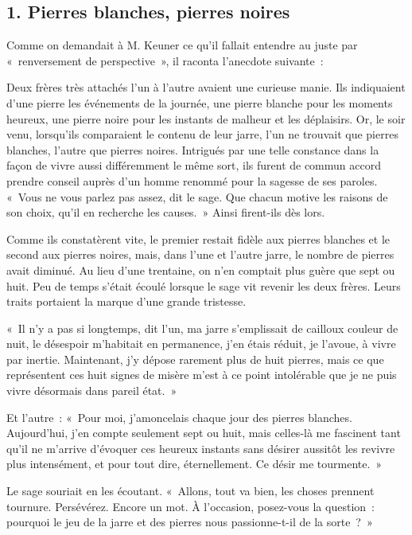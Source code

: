 \documentclass[french,twoside]{book} %
\begin{document}
\subsection[{1. Pierres blanches, pierres noires}]{\textsc{1.} Pierres blanches, pierres noires}
\noindent Comme on demandait à M. Keuner ce qu’il fallait entendre au juste par « renversement de perspective », il raconta l’anecdote suivante :\par
Deux frères très attachés l’un à l’autre avaient une curieuse manie. Ils indiquaient d’une pierre les événements de la journée, une pierre blanche pour les moments heureux, une pierre noire pour les instants de malheur et les déplaisirs. Or, le soir venu, lorsqu’ils comparaient le contenu de leur jarre, l’un ne trouvait que pierres blanches, l’autre que pierres noires. Intrigués par une telle constance dans la façon de vivre aussi différemment le même sort, ils furent de commun accord prendre conseil auprès d’un homme renommé pour la sagesse de ses paroles. « Vous ne vous parlez pas assez, dit le sage. Que chacun motive les raisons de son choix, qu’il en recherche les causes. » Ainsi firent-ils dès lors.\par
Comme ils constatèrent vite, le premier restait fidèle aux pierres blanches et le second aux pierres noires, mais, dans l’une et l’autre jarre, le nombre de pierres avait diminué. Au lieu d’une trentaine, on n’en comptait plus guère que sept ou huit. Peu de temps s’était écoulé lorsque le sage vit revenir les deux frères. Leurs traits portaient la marque d’une grande tristesse.\par
« Il n’y a pas si longtemps, dit l’un, ma jarre s’emplissait de cailloux couleur de nuit, le désespoir m’habitait en permanence, j’en étais réduit, je l’avoue, à vivre par inertie. Maintenant, j’y dépose rarement plus de huit pierres, mais ce que représentent ces huit signes de misère m’est à ce point intolérable que je ne puis vivre désormais dans pareil état. »\par
Et l’autre : « Pour moi, j’amoncelais chaque jour des pierres blanches. Aujourd’hui, j’en compte seulement sept ou huit, mais celles-là me fascinent tant qu’il ne m’arrive d’évoquer ces heureux instants sans désirer aussitôt les revivre plus intensément, et pour tout dire, éternellement. Ce désir me tourmente. »\par
Le sage souriait en les écoutant. « Allons, tout va bien, les choses prennent tournure. Persévérez. Encore un mot. À l’occasion, posez-vous la question : pourquoi le jeu de la jarre et des pierres nous passionne-t-il de la sorte ? »\par
\end{document}
